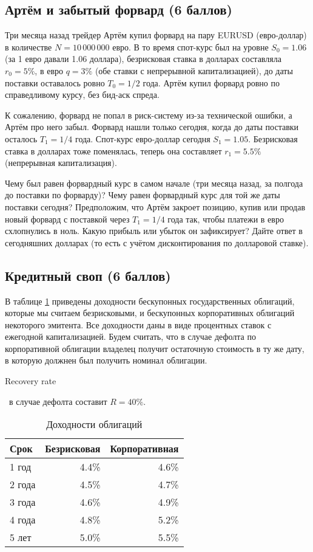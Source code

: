 \documentclass[a4paper,14pt]{extarticle}
\newcommand{\en}[1]{\begin{otherlanguage}{english}#1\end{otherlanguage}}
\begin{document}
\subsection{Артём и забытый форвард (6 баллов)}

Три месяца назад трейдер Артём купил форвард на пару EURUSD (евро-доллар) в количестве $N=10\,000\,000$ евро. В то время спот-курс был на уровне $S_0=1.06$ (за 1 евро давали 1.06 доллара), безрисковая ставка в долларах составляла $r_0=5\%$, в евро $q=3\%$ (обе ставки с непрерывной капитализацией), до даты поставки оставалось ровно $T_0=1/2$ года. Артём купил форвард ровно по справедливому курсу, без бид-аск спреда.

К сожалению, форвард не попал в риск-систему из-за технической ошибки, а Артём про него забыл. Форвард нашли только сегодня, когда до даты поставки осталось $T_1=1/4$ года. Спот-курс евро-доллар сегодня $S_1=1.05$. Безрисковая ставка в долларах тоже поменялась, теперь она составляет $r_1=5.5\%$ (непрерывная капитализация).

Чему был равен форвардный курс в самом начале (три месяца назад, за полгода до поставки по форварду)? Чему равен форвардный курс для той же даты поставки сегодня? Предположим, что Артём закроет позицию, купив или продав новый форвард с поставкой через $T_1=1/4$ года так, чтобы платежи в евро схлопнулись в ноль. Какую прибыль или убыток он зафиксирует? Дайте ответ в сегодняшних долларах (то есть с учётом дисконтирования по долларовой ставке).

\subsection{Кредитный своп (6 баллов)}

В таблице \ref{bond_yields} приведены доходности бескупонных государственных облигаций, которые мы считаем безрисковыми, и бескупонных корпоративных облигаций некоторого эмитента. Все доходности даны в виде процентных ставок с ежегодной капитализацией. Будем считать, что в случае дефолта по корпоративной облигации владелец получит остаточную стоимость в ту же дату, в которую должнен был получить номинал облигации. \en{Recovery rate}\ в случае дефолта составит $R=40\%$.

\begin{table}[h]
\centering
\begin{tabular}{l|r|r}
Срок & Безрисковая & Корпоративная \\ \hline
1 год & 4.4\% & 4.6\% \\
2 года & 4.5\% & 4.7\% \\
3 года & 4.6\% & 4.9\% \\
4 года & 4.8\% & 5.2\% \\
5 лет & 5.0\% & 5.5\% 
\end{tabular}
\caption {Доходности облигаций}
\label{bond_yields}
\end{table}
\end{document}
